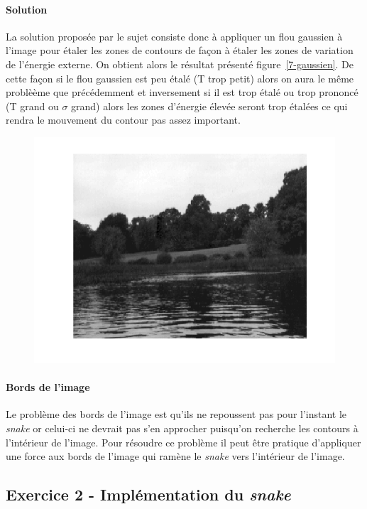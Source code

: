 \documentclass{article}
\begin{document}
\paragraph{Solution}
La solution proposée par le sujet consiste donc à appliquer un flou gaussien à l'image pour étaler les zones de contours de façon à étaler les zones de variation de l'énergie externe. On obtient alors le résultat présenté figure~\ref{7-gaussien}. De cette façon si le flou gaussien est peu étalé (T trop petit) alors on aura le même problèème que précédemment et inversement si il est trop étalé ou trop prononcé (T grand ou $\sigma$ grand) alors les zones d'énergie élevée seront trop étalées ce qui rendra le mouvement du contour pas assez important.

\begin{figure}[!ht]
\includegraphics[width=\textwidth]{images/1/1-1-autumn_b.png}
\end{figure}

\paragraph{Bords de l'image}
Le problème des bords de l'image est qu'ils ne repoussent pas pour l'instant le \emph{snake} or celui-ci ne devrait pas s'en approcher puisqu'on recherche les contours à l'intérieur de l'image. Pour résoudre ce problème il peut être pratique d'appliquer une force aux bords de l'image qui ramène le \emph{snake} vers l'intérieur de l'image.

\subsection{Exercice 2 - Implémentation du \emph{snake}}
\end{document}
